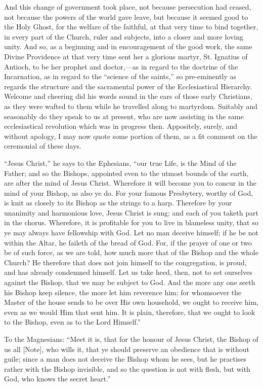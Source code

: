 And this change of government took place, not because
persecution had ceased, not because the powers of the
world gave leave, but because it seemed good to the Holy
Ghost, for the welfare of the faithful, at that very time
to bind together, in every part of the Church, ruler and
subjects, into a closer and more loving unity. And so, as
a beginning and in encouragement of the good work, the
same Divine Providence at that very time sent her a
glorious martyr, St. Ignatius of Antioch, to be her
prophet and doctor,—as in regard to the doctrine of
the Incarnation, as in regard to the ``science of the
saints,'' so pre-eminently as regards the structure
and the sacramental power of the Ecclesiastical
Hierarchy. Welcome and cheering did his words sound in
the ears of those early Christians, as they were wafted
to them while he travelled along to martyrdom. Suitably
and seasonably do they speak to us at present, who are
now assisting in the same ecclesiastical revolution which
was in progress then. Appositely, surely, and without
apology, I may now quote some portion of them, as a fit
comment on the ceremonial of these days.

``Jesus Christ,'' he says to the Ephesians,
``our true Life, is the Mind of the Father; and so
the Bishops, appointed even to the utmost bounds of the
earth, are after the mind of Jesus Christ. Wherefore it
will become you to concur in the mind of your Bishop, as
also ye do. For your famous Presbytery, worthy of God, is
knit as closely to its Bishop as the strings to a harp.
Therefore by your unanimity and harmonious love, Jesus
Christ is sung; and each of you taketh part in the
chorus. Wherefore, it is profitable for you to live in
blameless unity, that so ye may always have fellowship
with God. Let no man deceive himself; if he be not within
the Altar, he faileth of the bread of God. For, if the
prayer of one or two be of such force, as we are told,
how much more that of the Bishop and the whole Church? He
therefore that does not join himself to the congregation,
is proud, and has already condemned himself. Let us take
heed, then, not to set ourselves against the Bishop, that
we may be subject to God. And the more any one seeth his
Bishop keep silence, the more let him reverence him; for
whomsoever the Master of the house sends to be over His
own household, we ought to receive him, even as we would
Him that sent him. It is plain, therefore, that we ought
to look to the Bishop, even as to the Lord Himself.''

To the Magnesians: ``Meet it is, that for the
honour of Jesus Christ, the Bishop of us all [Note], who wills
it, that ye should preserve an obedience that is without
guile; since a man does not deceive the Bishop whom he
sees, but he practises rather with the Bishop invisible,
and so the question is not with flesh, but with God, who
knows the secret heart.''

